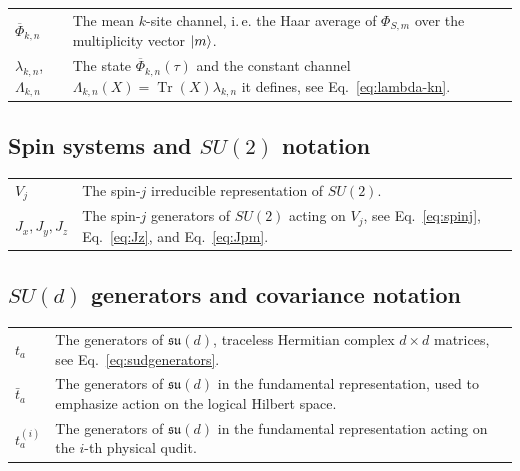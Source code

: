 \documentclass[10pt,twocolumn,superscriptaddress,aps,amsmath,amssymb,citeautoscript,floatfix,prx]{revtex4-2}
\theoremstyle{plain}
\theoremstyle{plain}
\theoremstyle{plain}
\theoremstyle{plain}
\theoremstyle{plain}
\theoremstyle{plain}
\theoremstyle{plain}
\theoremstyle{definition}
\theoremstyle{plain}
\begin{document}
\begin{appendix}
\begin{tabular}{@{}ll@{}}
\parbox[t]{0.22\textwidth}{$\overline\Phi_{k,n}$} & \parbox[t]{0.72\textwidth}{The mean $k$-site channel, i.\,e. the Haar average of $\Phi_{S,m}$ over the multiplicity vector $\ket m$.} \\[0.6em]

\parbox[t]{0.22\textwidth}{$\lambda_{k,n}$, $\Lambda_{k,n}$} & \parbox[t]{0.72\textwidth}{The state $\overline\Phi_{k,n}(\tau)$ and the constant channel $\Lambda_{k,n}(X)=\operatorname{Tr}(X)\lambda_{k,n}$ it defines, see Eq.~\eqref{eq:lambda-kn}.} \\[0.6em]

\end{tabular}


\subsection*{Spin systems and \(SU(2)\) notation}

\begin{tabular}{@{}ll@{}}

\parbox[t]{0.22\textwidth}{$V_j$} & \parbox[t]{0.72\textwidth}{The spin-$j$ irreducible representation of $SU(2)$.} \\[0.6em]

\parbox[t]{0.22\textwidth}{$J_x, J_y, J_z$} & \parbox[t]{0.72\textwidth}{The spin-$j$ generators of $SU(2)$ acting on $V_j$, see Eq.~\eqref{eq:spinj}, Eq.~\eqref{eq:Jz}, and Eq.~\eqref{eq:Jpm}.} \\[0.6em]

\end{tabular}


\subsection*{\(SU(d)\) generators and covariance notation}

\begin{tabular}{@{}ll@{}}

\parbox[t]{0.22\textwidth}{$t_a$} & \parbox[t]{0.72\textwidth}{The generators of $\mathfrak{su}(d)$, traceless Hermitian complex $d\times d$ matrices, see Eq.~\eqref{eq:sudgenerators}.} \\[0.6em]

\parbox[t]{0.22\textwidth}{$\bar{t}_a$} & \parbox[t]{0.72\textwidth}{The generators of $\mathfrak{su}(d)$ in the fundamental representation, used to emphasize action on the logical Hilbert space.} \\[0.6em]

\parbox[t]{0.22\textwidth}{$t_a^{(i)}$} & \parbox[t]{0.72\textwidth}{The generators of $\mathfrak{su}(d)$ in the fundamental representation acting on the $i$-th physical qudit.} \\[0.6em]


\end{tabular}
\end{appendix}
\end{document}
